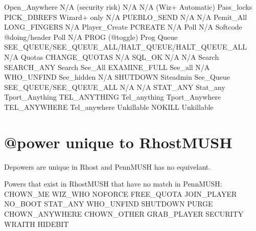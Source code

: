 \documentclass[letterpaper,10pt,english]{sphinxmanual}
\begin{document}
\begin{description}
Open\_Anywhere           N/A (security risk)                                N/A
N/A                     (Wiz+ Automatic)                                   Pass\_locks
PICK\_DBREFS             Wizard+ only                                       N/A
PUEBLO\_SEND             N/A                                                N/A
Pemit\_All               LONG\_FINGERS                                       N/A
Player\_Create           PCREATE                                            N/A
Poll                    N/A \textendash{} Softcode @doing/header                      Poll
N/A                     PROG (@toggle)                                     Prog
Queue                   SEE\_QUEUE/SEE\_QUEUE\_ALL/HALT\_QUEUE/HALT\_QUEUE\_ALL  N/A
Quotas                  CHANGE\_QUOTAS                                      N/A
SQL\_OK                  N/A                                                N/A
Search                  SEARCH\_ANY                                         Search
See\_All                 EXAMINE\_FULL                                       See\_all
N/A                     WHO\_UNFIND                                         See\_hidden
N/A                     SHUTDOWN                                           Siteadmin
See\_Queue               SEE\_QUEUE/SEE\_QUEUE\_ALL                            N/A
N/A                     STAT\_ANY                                           Stat\_any
Tport\_Anything          TEL\_ANYTHING                                       Tel\_anything
Tport\_Anywhere          TEL\_ANYWHERE                                       Tel\_anywhere
Unkillable              NOKILL                                             Unkillable

\end{description}


\section{@power unique to RhostMUSH}
\label{\detokenize{31-comparison:power-unique-to-rhostmush}}
\sphinxAtStartPar
Depowers are unique in Rhost and PennMUSH has no equivelant.

\sphinxAtStartPar
Powers that exist in RhostMUSH that have no match in PennMUSH:
CHOWN\_ME                     WIZ\_WHO                       NOFORCE
FREE\_QUOTA                   JOIN\_PLAYER                   NO\_BOOT
STAT\_ANY                     WHO\_UNFIND                    SHUTDOWN
PURGE                        CHOWN\_ANYWHERE                CHOWN\_OTHER
GRAB\_PLAYER                  SECURITY                      WRAITH
HIDEBIT
\end{document}
